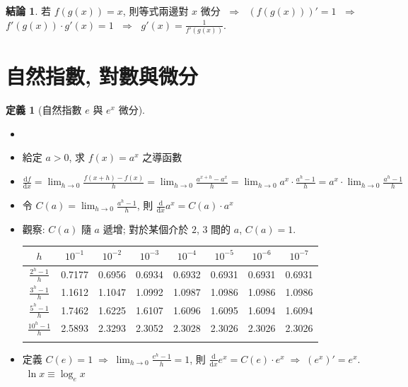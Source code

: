 \documentclass[12pt]{extarticle}
\newcommand{\ds}{\displaystyle}
\newcommand{\ie}{\;\Longrightarrow\;}
\theoremstyle{definition}
\newtheorem*{dfn}{定義}
\newtheorem*{fact}{結論}
\newcommand{\diff}[2]{\frac{\mathrm{d} #1}{\mathrm{d} #2}}
\begin{document}
\begin{fact}
  若 $f(g(x)) = x$, 則等式兩邊對 $x$ 微分 $\ie$ $\ds(f(g(x)))' = 1$ $\ie$ $\ds f'(g(x))\cdot g'(x) = 1$ $\ie$ $\ds g'(x) = \frac{1}{f'(g(x))}$.   
\end{fact}

\section*{自然指數, 對數與微分}

\begin{dfn}[自然指數 $e$ 與 $e^x$ 微分]
  \begin{itemize}\setlength\itemsep{0em}
    \item[]
    \item 給定 $a > 0$, 求 $f(x) = a^x$ 之導函數
    \item $\ds\diff{f}{x}=\lim_{h \to 0} \frac{f(x+h) - f(x)}{h} = \lim_{h \to 0} \frac{a^{x+h} - a^x}{h} = \lim_{h \to 0} a^x \cdot \frac{a^{h} - 1}{h} = a^x \cdot \lim_{h \to 0} \frac{a^{h} - 1}{h}$
    \item 令 $\ds C(a) = \lim_{h \to 0} \frac{a^{h} - 1}{h}$, 則 $\ds\diff{}{x}a^x =  C(a)\cdot a^x$
    \item 觀察: $C(a)$ 隨 $a$ 遞增; 對於某個介於 $2$, $3$ 間的 $a$, $C(a) = 1$. 
      \begin{table}[!htbp]
        \centering
        \begin{tabular}{cccccccc}
        \toprule
        $h$ & $10^{-1}$ & $10^{-2}$ & $10^{-3}$ & $10^{-4}$ & $10^{-5}$ & $10^{-6}$ & $10^{-7}$ \\
        \midrule
        \addlinespace[1mm]
        $\ds\frac{2^h-1}{h}$ & 0.7177 & 0.6956 & 0.6934 & 0.6932 & 0.6931 & 0.6931 & 0.6931 \\
        \addlinespace[1mm]
        $\ds\frac{3^h-1}{h}$ & 1.1612 & 1.1047 & 1.0992 & 1.0987 & 1.0986 & 1.0986 & 1.0986 \\
        \addlinespace[1mm]
        $\ds\frac{5^h-1}{h}$ & 1.7462 & 1.6225 & 1.6107 & 1.6096 & 1.6095 & 1.6094 & 1.6094 \\
        \addlinespace[1mm]
        $\ds\frac{10^h-1}{h}$ & 2.5893 & 2.3293 & 2.3052 & 2.3028 & 2.3026 & 2.3026 & 2.3026 \\ 
        \addlinespace[1mm]
        \bottomrule
        \end{tabular}
      \end{table}
    \item 定義 $\ds C(e) = 1 \ie \lim_{h\to 0}\frac{e^h - 1}{h} = 1$, 則 $\ds\diff{}{x}e^x = C(e)\cdot e^x \ie (e^x)' = e^x$. $\ds\;\ln x \equiv\log_e x$
  \end{itemize}
\end{dfn}
\end{document}
